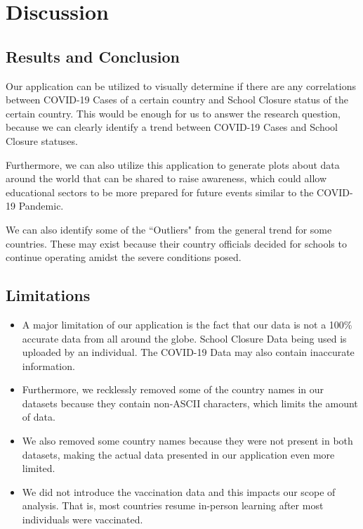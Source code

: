 \documentclass[fontsize=11pt]{article}
\begin{document}
    \section{Discussion}

    \subsection{Results and Conclusion}

    Our application can be utilized to visually determine if there are any correlations between COVID-19 Cases of a certain country and School Closure status of the certain country. This would be enough for us to answer the research question, because we can clearly identify a trend between COVID-19 Cases and School Closure statuses.

    Furthermore, we can also utilize this application to generate plots about data around the world that can be shared to raise awareness, which could allow educational sectors to be more prepared for future events similar to the COVID-19 Pandemic.

    We can also identify some of the ``Outliers" from the general trend for some countries. These may exist because their country officials decided for schools to continue operating amidst the severe conditions posed.

    \subsection{Limitations}

    \begin{itemize}
        \item A major limitation of our application is the fact that our data is not a 100\% accurate data from all around the globe. School Closure Data being used is uploaded by an individual. The COVID-19 Data may also contain inaccurate information.
        \item Furthermore, we recklessly removed some of the country names in our datasets because they contain non-ASCII characters, which limits the amount of data.
        \item We also removed some country names because they were not present in both datasets, making the actual data presented in our application even more limited.
        \item We did not introduce the vaccination data and this impacts our scope of analysis. That is, most countries resume in-person learning after most individuals were vaccinated.
    \end{itemize}
\end{document}
